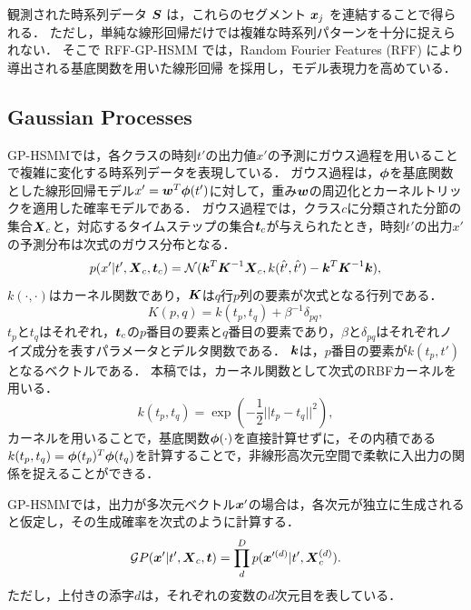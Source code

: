 \documentclass[conference]{IEEEtran}
\begin{document}
観測された時系列データ ${ \boldsymbol S}$ は，これらのセグメント ${ \boldsymbol x}_j$ を連結することで得られる．  
ただし，単純な線形回帰だけでは複雑な時系列パターンを十分に捉えられない．  
そこで RFF-GP-HSMM では，Random Fourier Features (RFF) により導出される基底関数を用いた線形回帰\cite{Rahimi2007} を採用し，モデル表現力を高めている．

\subsection{Gaussian Processes}
GP-HSMMでは，各クラスの時刻$t'$の出力値$x'$の予測にガウス過程を用いることで複雑に変化する時系列データを表現している．
ガウス過程は，${\boldsymbol\phi}$を基底関数とした線形回帰モデル$x' = { \boldsymbol w}^T {\boldsymbol\phi}(t')$に対して，重み${ \boldsymbol w}$の周辺化とカーネルトリックを適用した確率モデルである．
ガウス過程では，クラス$c$に分類された分節の集合${ \boldsymbol X}_c$と，対応するタイムステップの集合${ \boldsymbol t}_c$が与えられたとき，時刻$t'$の出力$x'$の予測分布は次式のガウス分布となる．
%
\begin{equation}
p(x'|t',\bX_c, \bt_c)  = {\mathcal N}(\bk^{T}\bK^{-1}\bX_c, k(\hat{t'}, \hat{t'})-\bk^{T}\bK^{-1}\bk), \label{eq:gp_pred}
\end{equation}
%
$k(\cdot, \cdot)$はカーネル関数であり，${ \boldsymbol K}$は$q$行$p$列の要素が次式となる行列である．
%
\begin{equation}
\label{equ:covariance_func}
K(p, q)=k(t_{p},t_{q})+\beta^{-1}\delta_{pq}, 
\end{equation}
%
$t_p$と$t_q$はそれぞれ，${ \boldsymbol t}_c$の$p$番目の要素と$q$番目の要素であり，$\beta$と$\delta_{pq}$はそれぞれノイズ成分を表すパラメータとデルタ関数である．
${ \boldsymbol k}$は，$p$番目の要素が$k(t_p, t')$となるベクトルである．
本稿では，カーネル関数として次式のRBFカーネルを用いる．
%
\begin{equation}
k(t_p,t_q)=\exp(-\frac{1}{2}||t_{p}-t_{q}||^{2}), \label{eq:rbf}
\end{equation}
%
カーネルを用いることで，基底関数${\boldsymbol\phi}(\cdot)$を直接計算せずに，その内積である$k(t_p,t_q)={\boldsymbol\phi}(t_p)^T {\boldsymbol\phi}(t_q)$を計算することで，非線形高次元空間で柔軟に入出力の関係を捉えることができる．

GP-HSMMでは，出力が多次元ベクトル${ \boldsymbol x}'$の場合は，各次元が独立に生成されると仮定し，その生成確率を次式のように計算する．
%
\begin{equation}
\label{equ:multi_dim}
{\mathcal GP(\bx'|t', \bX_{c}, \bt)} = \prod_d^D p(\bx'^{(d)}|t', \bX^{(d)}_{c}).
\end{equation}
%
ただし，上付きの添字$d$は，それぞれの変数の$d$次元目を表している．
\end{document}
